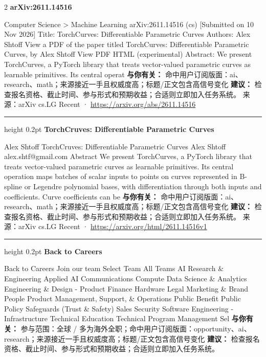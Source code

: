 \documentclass[10.5pt]{ctexart}
\begin{document}
\begin{multicols}{2}
{\large\bfseries arXiv:2611.14516}\par
Computer Science > Machine Learning arXiv:2611.14516 (cs) [Submitted on 10 Nov 2026] Title: TorchCurves: Differentiable Parametric Curves Authors: Alex Shtoff View a PDF of the paper titled TorchCurves: Differentiable Parametric Curves, by Alex Shtoff View PDF HTML (experimental) Abstract: We present TorchCurves, a PyTorch library that treats vector-valued parametric curves as learnable primitives. Its central operat
\textbf{与你有关：} 命中用户订阅版面：ai、research、math；来源接近一手且权威度高；标题/正文包含高信号变化
\textbf{建议：} 检查报名资格、截止时间、参与形式和预期收益；合适则立即加入任务系统。
{\footnotesize\color{ormuted} 来源：arXiv cs.LG Recent · \url{https://arxiv.org/abs/2611.14516}}
\vspace{2mm}
\hrule height 0.2pt
\vspace{2mm}
{\large\bfseries TorchCruves: Differentiable Parametric Curves}\par
Alex Shtoff TorchCruves: Differentiable Parametric Curves Alex Shtoff alex.shtf@gmail.com Abstract We present TorchCurves, a PyTorch library that treats vector-valued parametric curves as learnable primitives. Its central operation maps batches of scalar inputs to points on curves represented in B-spline or Legendre polynomial bases, with differentiation through both inputs and coefficients. Curve coefficients can be
\textbf{与你有关：} 命中用户订阅版面：ai、research、math；来源接近一手且权威度高；标题/正文包含高信号变化
\textbf{建议：} 检查报名资格、截止时间、参与形式和预期收益；合适则立即加入任务系统。
{\footnotesize\color{ormuted} 来源：arXiv cs.LG Recent · \url{https://arxiv.org/html/2611.14516v1}}
\vspace{2mm}
\hrule height 0.2pt
\vspace{2mm}
{\large\bfseries Back to Careers}\par
Back to Careers Join our team Select Team All Teams AI Research \& Engineering Applied AI Communications Compute Data Science \& Analytics Engineering \& Design - Product Finance Hardware Legal Marketing \& Brand People Product Management, Support, \& Operations Public Benefit Public Policy Safeguards (Trust \& Safety) Sales Security Software Engineering - Infrastructure Technical Education Technical Program Management Sel
\textbf{与你有关：} 参与范围：全球 / 多为海外全职；命中用户订阅版面：opportunity、ai、research；来源接近一手且权威度高；标题/正文包含高信号变化
\textbf{建议：} 检查报名资格、截止时间、参与形式和预期收益；合适则立即加入任务系统。

\end{multicols}
\end{document}

